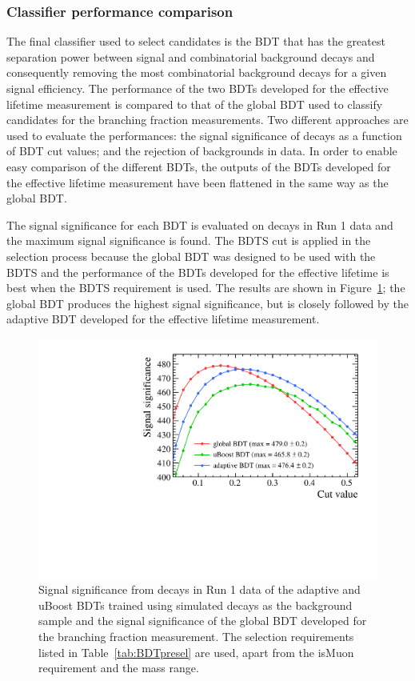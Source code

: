 \subsubsection{Classifier performance comparison}

The final classifier used to select \bsmumu candidates is the BDT that has the greatest separation power between signal and combinatorial background decays and consequently removing the most combinatorial background decays for a given signal efficiency. The performance of the two BDTs developed for the effective lifetime measurement is compared to that of the global BDT used to classify candidates for the branching fraction measurements. Two different approaches are used to evaluate the performances: the signal significance of \bhh decays as a function of BDT cut values; and the rejection of \bsmumu backgrounds in data. In order to enable easy comparison of the different BDTs, the outputs of the BDTs developed for the effective lifetime measurement have been flattened in the same way as the global BDT. %

The signal significance for each BDT is evaluated on \bhh decays in Run 1 data and the maximum signal significance is found. The BDTS cut is applied in the selection process because the global BDT was designed to be used with the BDTS and the performance of the BDTs developed for the effective lifetime is best when the BDTS requirement is used. The results are shown in Figure~\ref{fig:SSall}; the global BDT produces the highest signal significance, but is closely followed by the adaptive BDT developed for the effective lifetime measurement. 

\begin{figure}[htbp]
    \centering
        \includegraphics[width=0.6 \textwidth]{./Figs/Selection/BDT_comp_zoom.pdf}
    \caption{Signal significance from \bhh decays in Run 1 data of the adaptive and uBoost BDTs trained using simulated decays as the background sample and the signal significance of the global BDT developed for the branching fraction measurement. The selection requirements listed in Table~\ref{tab:BDTpresel} are used, apart from the isMuon requirement and the mass range. }
    \label{fig:SSall}
\end{figure}


